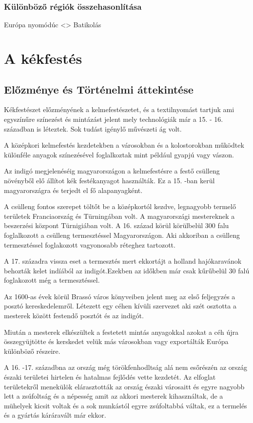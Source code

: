 \documentclass[fontsize=12pt, appendixprefix=true]{scrreprt}
\begin{document}
\subsection{Különböző régiók összehasonlítása}
   Európa nyomódúc <> Batikolás

\chapter{A kékfestés}
\section{Előzménye és Történelmi áttekintése}
Kékfestészet előzményének a kelmefestészetet, és a textilnyomást tartjuk ami egyszínűre színezést és mintázást jelent mely technológiák már a 15. - 16. században is léteztek. Sok tudást igénylő művészeti ág volt.

A középkori kelmefestés kezdetekben a városokban és a kolostorokban működtek különféle anyagok színezésével foglalkoztak mint például gyapjú vagy vászon. 

Az indigó megjelenéséig magyarországon a kelmefestésre a festő csülleng növényből elő állítot kék festékanyagot használták. Ez a 15. -ban kerül magyarországra és terjedt el fő alapanyagként.

A csülleng fontos szerepet töltőt be a középkortól kezdve, legnagyobb termelő területek Franciaország és Türningában volt. A magyarországi mestereknek a beszerzési központ Türnigiában volt.
A 16. század körül körülbelül 300 falu foglalkozott a csülleng termesztéssel Magyarországon. Aki akkoriban a csülleng termesztéssel foglakozott vagyonosabb réteghez tartozott. 

A 17. századra vissza eset a termesztés mert ekkortájt a holland hajókaravánok behozták kelet indíából az indigót.Ezekben az időkben már csak kűrűbelül 30 falú foglakozott még a termesztéssel.

Az 1600-as évek körül Brassó város könyveiben jelent meg az első feljegyzés a posztó kereskedelemről.
Létezett egy céhen kívüli szervezet aki szét osztotta a mesterek között festendő posztót és az indigót. 

Miután a mesterek elkészültek a festetett mintás anyagokkal azokat a céh újra összegyüjtötte és kerskedet velük más városokban vagy exportálták Európa különböző részeire.

A 16. -17. századbna az ország még törökfenhodltság alá nem esőrészén az ország északi területei hirtelen és hatalmas fejlődés vette kezdetét.
Az elfoglat területekről menekülök elárasztották az ország északi városaitt és egyre nagyobb lett a zsúfoltság és a népesség amit az akkori mesterek kihasználtak, de a mühelyek kicsit voltak és a sok munkástól egyre zsúfoltabbá váltak, ez a termelés és a gyártás káráravált már ekkor.
\end{document}
